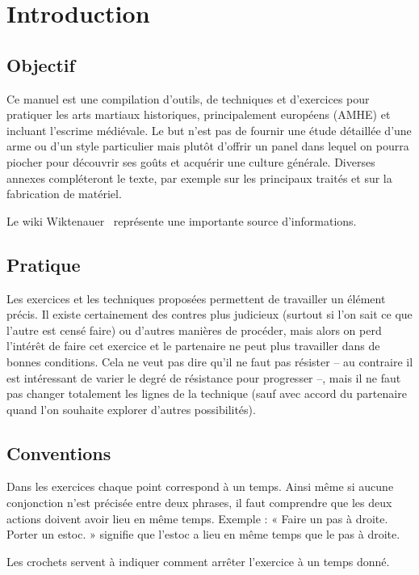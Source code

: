 \chapter{Introduction}


\section{Objectif}

Ce manuel est une compilation d'outils, de techniques et d'exercices pour pratiquer les arts martiaux historiques, principalement européens (AMHE) et incluant l'escrime médiévale.
Le but n'est pas de fournir une étude détaillée d'une arme ou d'un style particulier mais plutôt d'offrir un panel dans lequel on pourra piocher pour découvrir ses goûts et acquérir une culture générale.
Diverses annexes compléteront le texte, par exemple sur les principaux traités et sur la fabrication de matériel.

Le wiki Wiktenauer~\cite{wiktenauer} représente une importante source d'informations.


\section{Pratique}

Les exercices et les techniques proposées permettent de travailler un élément précis.
Il existe certainement des contres plus judicieux (surtout si l'on sait ce que l'autre est censé faire) ou d'autres manières de procéder, mais alors on perd l'intérêt de faire cet exercice et le partenaire ne peut plus travailler dans de bonnes conditions.
Cela ne veut pas dire qu'il ne faut pas résister – au contraire il est intéressant de varier le degré de résistance pour progresser –, mais il ne faut pas changer totalement les lignes de la technique (sauf avec accord du partenaire quand l'on souhaite explorer d'autres possibilités).


\section{Conventions}

Dans les exercices chaque point correspond à un temps. Ainsi même si aucune conjonction n'est précisée entre deux phrases, il faut comprendre que les deux actions doivent avoir lieu en même temps. Exemple : « Faire un pas à droite. Porter un estoc. » signifie que l'estoc a lieu en même temps que le pas à droite.

Les crochets servent à indiquer comment arrêter l'exercice à un temps donné.

